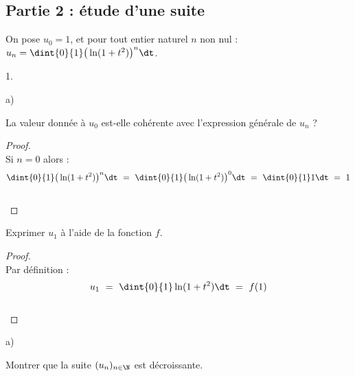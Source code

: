 \documentclass[11pt]{article}%
\begin{document}


\subsection*{Partie 2 : étude d'une suite}

\noindent
On pose $u_0 = 1$, et pour tout entier naturel $n$ non nul : $u_n =
\dint{0}{1} \big( \ln(1 + t^2) \big)^n \dt$.

\begin{noliste}{1.}
  \setcounter{enumi}{6} %
  \setlength{\itemsep}{4mm}
\item
  \begin{noliste}{a)}
    \setlength{\itemsep}{2mm}
  \item La valeur donnée à $u_0$ est-elle cohérente avec l'expression
    générale de $u_n$ ?

    \begin{proof}~\\%
      Si $n = 0$ alors :
      \[
      \dint{0}{1} \big( \ln(1 + t^2) \big)^n \dt \ = \ \dint{0}{1}
      \big( \ln(1 + t^2) \big)^0 \dt \ = \ \dint{0}{1} 1 \dt \ = \ 1
      \]
      ~\\[-1cm]
    \end{proof}

  \item Exprimer $u_1$ à l'aide de la fonction $f$.

    \begin{proof}~\\%
      Par définition : 
      \[
      u_1 \ = \ \dint{0}{1} \ln(1 + t^2) \dt \ = \ f(1)
      \]
      ~\\[-1cm]
    \end{proof}
  \end{noliste}

\item
  \begin{noliste}{a)}
    \setlength{\itemsep}{2mm}
  \item Montrer que la suite $(u_n)_{n \in \N}$ est décroissante.


\end{noliste}
\end{noliste}
\end{document}
